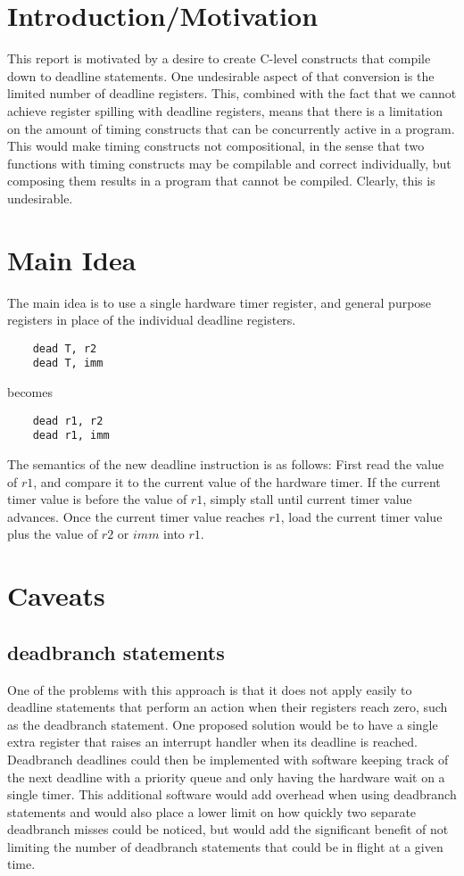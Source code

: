 \documentclass[12pt]{article}
\begin{document}
\section{Introduction/Motivation}
This report is motivated by a desire to create C-level constructs
that compile down to deadline statements. One undesirable aspect of
that conversion is the limited number of deadline registers. This,
combined with the fact that we cannot achieve register spilling with
deadline registers, means that there is a limitation on the amount of
timing constructs that can be concurrently active in a program.
This would make timing constructs not compositional, in the sense
that two functions with timing constructs may be compilable and correct
individually, but composing them results in a program that cannot be compiled.
Clearly, this is undesirable.

\section{Main Idea}
The main idea is to use a single hardware timer register, and general purpose
registers in place of the individual deadline registers.
\begin{lstlisting}
	dead T, r2
	dead T, imm
\end{lstlisting}
becomes
\begin{lstlisting}
	dead r1, r2
	dead r1, imm
\end{lstlisting}
The semantics of the new deadline instruction is as follows:
First read the value of $r1$, and compare it to the current value of the hardware timer.  If the current timer value is before the value of $r1$, simply stall
until current timer value advances.  Once the current timer value reaches $r1$,
load the current timer value plus the value of $r2$ or $imm$ into $r1$.

\section{Caveats}

\subsection{deadbranch statements}
One of the problems with this approach is that it does not apply easily
to deadline statements that perform an action when their registers reach zero,
such as the deadbranch statement. One proposed solution would be to have
a single extra register that raises an interrupt handler when its deadline
is reached.  Deadbranch deadlines could then be implemented with software
keeping track of the next deadline with a priority queue and only having
the hardware wait on a single timer.
This additional software would add overhead when using deadbranch statements
and would also place a lower limit on how quickly two separate deadbranch
misses could be noticed, but would add the significant benefit of not
limiting the number of deadbranch statements that could be in flight at
a given time.
\end{document}
